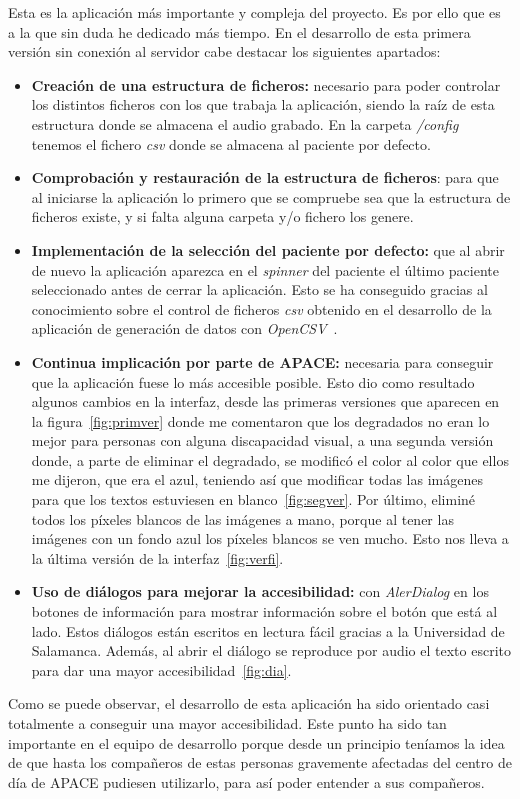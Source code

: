 Esta es la aplicación más importante y compleja del proyecto. Es por ello que es a la que sin duda he dedicado más tiempo. En el desarrollo de esta primera versión sin conexión al servidor cabe destacar los siguientes apartados:
\begin{itemize}
	\item \textbf{Creación de una estructura de ficheros:} necesario para poder controlar los distintos ficheros con los que trabaja la aplicación, siendo la raíz de esta estructura donde se almacena el audio grabado. En la carpeta \textit{/config} tenemos el fichero \textit{csv} donde se almacena al paciente por defecto.
	\item \textbf{Comprobación y restauración de la estructura de ficheros}: para que al iniciarse la aplicación lo primero que se compruebe sea que la estructura de ficheros existe, y si falta alguna carpeta y/o fichero los genere.
	\item \textbf{Implementación de la selección del paciente por defecto:} que al abrir de nuevo la aplicación aparezca en el \textit{spinner} del paciente el último paciente seleccionado antes de cerrar la aplicación. Esto se ha conseguido gracias al conocimiento sobre el control de ficheros \textit{csv} obtenido en el desarrollo de la aplicación de generación de datos con \textit{OpenCSV}~\cite{opencsv}.
	\item \textbf{Continua implicación por parte de APACE:} necesaria para conseguir que la aplicación fuese lo más accesible posible. Esto dio como resultado algunos cambios en la interfaz, desde las primeras versiones que aparecen en la figura~\ref{fig:primver} donde me comentaron que los degradados no eran lo mejor para personas con alguna discapacidad visual, a una segunda versión donde, a parte de eliminar el degradado, se modificó el color al color que ellos me dijeron, que era el azul, teniendo así que modificar todas las imágenes para que los textos estuviesen en blanco~\ref{fig:segver}. Por último, eliminé todos los píxeles blancos de las imágenes a mano, porque al tener las imágenes con un fondo azul los píxeles blancos se ven mucho. Esto nos lleva a la última versión de la interfaz~\ref{fig:verfi}.
	\item \textbf{Uso de diálogos para mejorar la accesibilidad:} con \textit{AlerDialog} en los botones de información para mostrar información sobre el botón que está al lado. Estos diálogos están escritos en lectura fácil gracias a la Universidad de Salamanca. Además, al abrir el diálogo se reproduce por audio el texto escrito para dar una mayor accesibilidad~\ref{fig:dia}.
\end{itemize}
Como se puede observar, el desarrollo de esta aplicación ha sido orientado casi totalmente a conseguir una mayor accesibilidad. Este punto ha sido tan importante en el equipo de desarrollo porque desde un principio teníamos la idea de que hasta los compañeros de estas personas gravemente afectadas del centro de día de APACE pudiesen utilizarlo, para así poder entender a sus compañeros.

